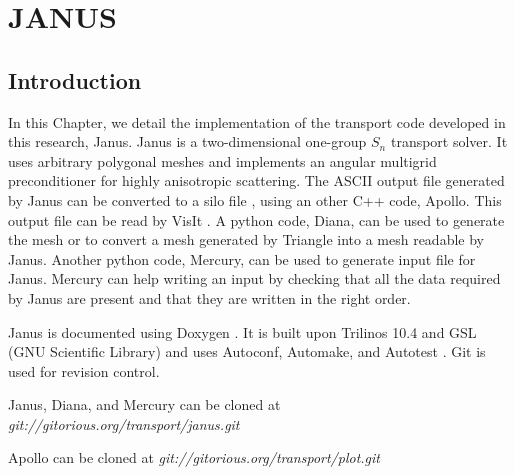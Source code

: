\chapter{\uppercase{Janus}}
\label{janus_chapter}
\section{Introduction}
In this Chapter, we detail the implementation of the transport code developed
in this research, Janus. Janus is a two-dimensional one-group $S_n$ transport
solver. It uses arbitrary polygonal meshes and implements an angular multigrid
preconditioner for highly anisotropic scattering. The ASCII output file generated
by Janus can be converted to a silo file \cite{silo}, using an other C++ code,
Apollo. This output file can be read by VisIt \cite{visit}. A python code, 
Diana, can be used to generate the mesh or to convert a mesh generated by Triangle
\cite{triangle} into a mesh readable by Janus. Another python code, Mercury,
can be used to generate input file for Janus. Mercury can help writing an
input by checking that all the data required by Janus are present and that
they are written in the right order. 

Janus is documented using Doxygen \cite{doxygen}. It is built upon Trilinos
10.4 \cite{trilinos} and GSL (GNU Scientific Library) \cite{gsl} and uses
Autoconf, Automake, and Autotest \cite{autoconf,automake}. Git \cite{git} 
is used for revision control. 

Janus, Diana, and Mercury can be cloned at 
\emph{\hbox{git://gitorious.org/transport/janus.git}} 

Apollo can be cloned at \emph{\hbox{git://gitorious.org/transport/plot.git}}

